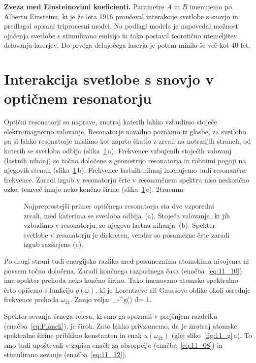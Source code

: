 \begin{example}{\bf Zveza med Einsteinovimi koeficienti.}
Parametre $A$ in $B$ imenujemo po Albertu Einsteinu, ki je že leta 
1916 proučeval interakcije svetlobe s snovjo in predlagal opisani triprocesni model. 
Na podlagi modela je napovedal možnost ojačenja svetlobe s stimulirano 
emisijo in tako postavil teoretično utemeljitev delovanja laserjev.
Do prvega delujočega laserja je potem minilo še  več kot 40 let. 
\end{example}

\section{Interakcija svetlobe s snovjo v optičnem resonatorju}
Optični resonatorji so naprave, znotraj katerih lahko vzbudimo 
stoječe elektromagnetno valovanje. Resonatorje navadno poznamo iz glasbe,
za svetlobo pa si lahko resonatorje mislimo kot zaprto škatlo
z zrcali na notranjih straneh, od katerih se svetloba 
odbija (slika~\ref{fig:11_resonator}\,a).
Frekvence vzbujenih stoječih valovanj (lastnih nihanj) so točno 
določene z geometrijo resonatorja in robnimi pogoji na njegovih 
stenah (slika~\ref{fig:11_resonator}\,b).
Frekvence lastnih nihanj imenujemo tudi resonančne frekvence. 
Zaradi izgub v resonatorju črte v resonančnem spektru niso 
neskončno ozke, temveč imajo neko končno širino
(slika~\ref{fig:11_resonator}\,c).
\vglue2truemm
\begin{figure}[h!]
\centering
\def\svgwidth{140truemm} 

\caption{Najpreprostejši primer optičnega resonatorja sta 
dve vzporedni zrcali, med katerima se svetloba odbija~(a). Stoječa
valovanja, ki jih vzbudimo v resonatorju, so njegova lastna nihanja~(b). 
Spekter svetlobe v resonatorju je diskreten, vendar so posamezne 
črte zaradi izgub razširjene (c).
}
\label{fig:11_resonator}
\end{figure}

Po drugi strani tudi energijska razlika med posameznima atomskima nivojema 
ni povsem točno določena. Zaradi končnega razpadnega časa 
(enačba~\ref{eq:11_10}) ima spekter prehoda neko končno širino. Tako imenovano
atomsko spektralno črto opišemo s funkcijo $g(\omega)$,
ki je Lorentzeve ali Gaussove oblike okoli osrednje 
frekvence prehoda $\omega_{21}$. Zanjo velja:
\beq
\int_{-\infty}^\infty g(\omega) d\omega = 1.
\label{eq:11_21}
\eeq

Spekter sevanja črnega telesa, ki smo ga spoznali v prejšnjem razdelku 
(enačba~\ref{eq:Planck}), je širok. Zato lahko privzamemo, da je 
znotraj atomske spektralne širine približno konstanten 
in enak $u(\omega_{21})$ (glej sliko~\ref{fig:11_g}\,a).
To smo tudi upoštevali v zapisu enačb za absorpcijo (enačba~\ref{eq:11_08})
in stimulirano sevanje (enačba~\ref{eq:11_12}). 

